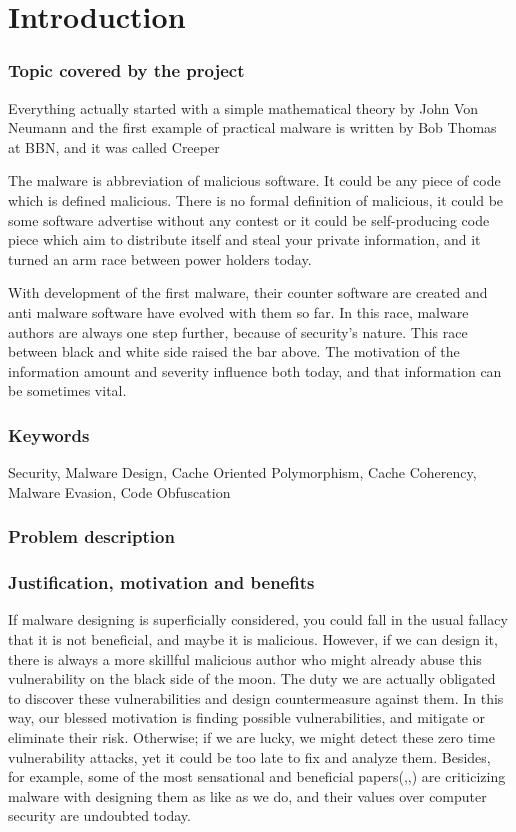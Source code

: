 \chapter{Introduction}

\subsection{Topic covered by the project}
Everything actually started with a simple mathematical theory by John Von Neumann \cite{von1966theory} and the first example of practical malware is written by Bob Thomas at BBN, and it was called Creeper 

The malware is abbreviation of malicious software. It could be any piece of code which is defined malicious. There is no formal definition of malicious, it could be some software advertise without any contest or it could be self-producing code piece which aim to distribute itself and steal your private information, and it turned an arm race between power holders today.

With development of the first malware, their counter software are created and anti malware software have evolved with them so far. In this race, malware authors are always one step further, because of security's nature. This race between black and white side raised the bar above. The motivation of the information amount and severity influence both today, and that information can be sometimes vital. 

\subsection{Keywords}
Security, Malware Design, Cache Oriented Polymorphism, Cache Coherency, Malware Evasion, Code Obfuscation

\subsection{Problem description}


\subsection{Justification, motivation and benefits}
If malware designing is superficially considered, you could fall in the usual fallacy that it is not beneficial, and maybe it is malicious. However, if we can design it, there is always a more skillful malicious author who might already abuse this vulnerability on the black side of the moon. The duty we are actually obligated to discover these vulnerabilities and design countermeasure against them. In this way, our blessed motivation is finding possible vulnerabilities, and mitigate or eliminate their risk. Otherwise; if we are lucky, we might detect these zero time vulnerability attacks, yet it could be too late to fix and analyze them. Besides, for example, some of the most sensational and beneficial papers(\cite{moser2007limits},\cite{cavallaro2008limits},\cite{egele2012survey}) are criticizing malware with designing them as like as we do, and their values over computer security are undoubted today. 

